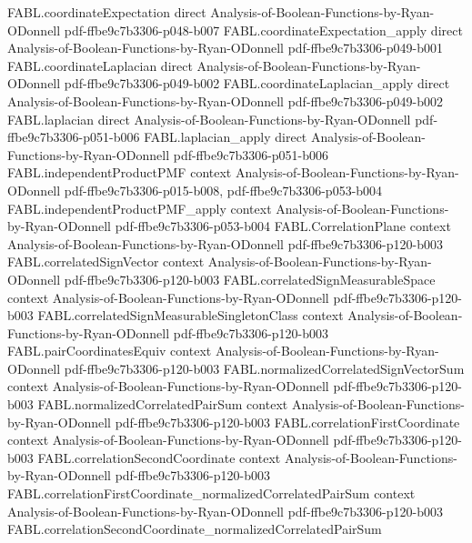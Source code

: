 \begin{theorem}
\proofstep
  {FABL.coordinateExpectation}
  {direct}
  {Analysis-of-Boolean-Functions-by-Ryan-ODonnell}
  {pdf-ffbe9c7b3306-p048-b007}
\proofstep
  {FABL.coordinateExpectation_apply}
  {direct}
  {Analysis-of-Boolean-Functions-by-Ryan-ODonnell}
  {pdf-ffbe9c7b3306-p049-b001}
\proofstep
  {FABL.coordinateLaplacian}
  {direct}
  {Analysis-of-Boolean-Functions-by-Ryan-ODonnell}
  {pdf-ffbe9c7b3306-p049-b002}
\proofstep
  {FABL.coordinateLaplacian_apply}
  {direct}
  {Analysis-of-Boolean-Functions-by-Ryan-ODonnell}
  {pdf-ffbe9c7b3306-p049-b002}
\proofstep
  {FABL.laplacian}
  {direct}
  {Analysis-of-Boolean-Functions-by-Ryan-ODonnell}
  {pdf-ffbe9c7b3306-p051-b006}
\proofstep
  {FABL.laplacian_apply}
  {direct}
  {Analysis-of-Boolean-Functions-by-Ryan-ODonnell}
  {pdf-ffbe9c7b3306-p051-b006}
\proofstep
  {FABL.independentProductPMF}
  {context}
  {Analysis-of-Boolean-Functions-by-Ryan-ODonnell}
  {pdf-ffbe9c7b3306-p015-b008,
    pdf-ffbe9c7b3306-p053-b004}
\proofstep
  {FABL.independentProductPMF_apply}
  {context}
  {Analysis-of-Boolean-Functions-by-Ryan-ODonnell}
  {pdf-ffbe9c7b3306-p053-b004}
\proofstep
  {FABL.CorrelationPlane}
  {context}
  {Analysis-of-Boolean-Functions-by-Ryan-ODonnell}
  {pdf-ffbe9c7b3306-p120-b003}
\proofstep
  {FABL.correlatedSignVector}
  {context}
  {Analysis-of-Boolean-Functions-by-Ryan-ODonnell}
  {pdf-ffbe9c7b3306-p120-b003}
\proofstep
  {FABL.correlatedSignMeasurableSpace}
  {context}
  {Analysis-of-Boolean-Functions-by-Ryan-ODonnell}
  {pdf-ffbe9c7b3306-p120-b003}
\proofstep
  {FABL.correlatedSignMeasurableSingletonClass}
  {context}
  {Analysis-of-Boolean-Functions-by-Ryan-ODonnell}
  {pdf-ffbe9c7b3306-p120-b003}
\proofstep
  {FABL.pairCoordinatesEquiv}
  {context}
  {Analysis-of-Boolean-Functions-by-Ryan-ODonnell}
  {pdf-ffbe9c7b3306-p120-b003}
\proofstep
  {FABL.normalizedCorrelatedSignVectorSum}
  {context}
  {Analysis-of-Boolean-Functions-by-Ryan-ODonnell}
  {pdf-ffbe9c7b3306-p120-b003}
\proofstep
  {FABL.normalizedCorrelatedPairSum}
  {context}
  {Analysis-of-Boolean-Functions-by-Ryan-ODonnell}
  {pdf-ffbe9c7b3306-p120-b003}
\proofstep
  {FABL.correlationFirstCoordinate}
  {context}
  {Analysis-of-Boolean-Functions-by-Ryan-ODonnell}
  {pdf-ffbe9c7b3306-p120-b003}
\proofstep
  {FABL.correlationSecondCoordinate}
  {context}
  {Analysis-of-Boolean-Functions-by-Ryan-ODonnell}
  {pdf-ffbe9c7b3306-p120-b003}
\proofstep
  {FABL.correlationFirstCoordinate_normalizedCorrelatedPairSum}
  {context}
  {Analysis-of-Boolean-Functions-by-Ryan-ODonnell}
  {pdf-ffbe9c7b3306-p120-b003}
\proofstep
  {FABL.correlationSecondCoordinate_normalizedCorrelatedPairSum}

\end{theorem}
